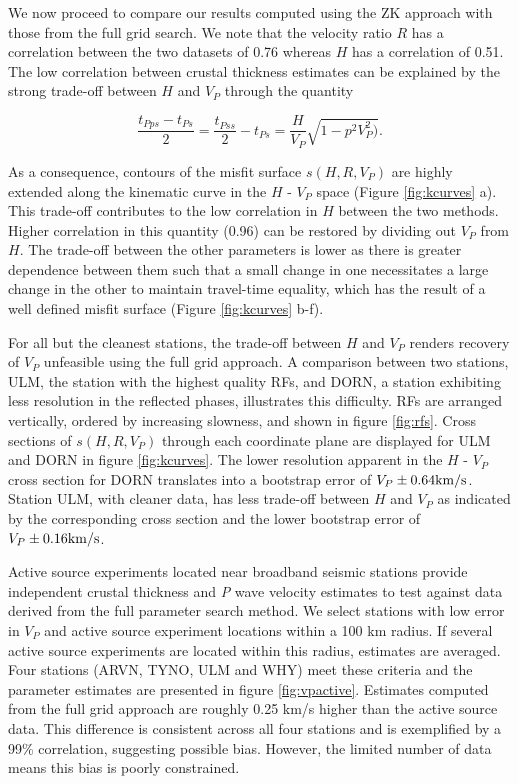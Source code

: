 \documentclass[review]{elsarticle}
\begin{document}
We now proceed to compare our results computed using the ZK approach with those from the full grid search. We note that the velocity ratio $R$ has a correlation between the two datasets of 0.76 whereas $H$ has a correlation of 0.51. The low correlation between crustal thickness estimates can be explained by the strong trade-off between $H$ and $V_P$ through the quantity

$$\frac{t_{Pps}-t_{Ps}}{2}=\frac{t_{Pss}}{2} - t_{Ps}= \frac{H}{V_P}\sqrt{1-p^2V^2_P)}.$$

\noindent As a consequence, contours of the misfit surface $s(H,R,V_P)$ are highly extended along the kinematic curve in the $H$ - $V_P$ space (Figure \ref{fig:kcurves} a). This trade-off contributes to the low correlation in $H$ between the two methods. Higher correlation in this quantity (0.96) can be restored by dividing out $V_P$ from $H$. The trade-off between the other parameters is lower as there is greater dependence between them such that a small change in one necessitates a large change in the other to maintain travel-time equality, which has the result of a well defined misfit surface (Figure \ref{fig:kcurves} b-f).

For all but the cleanest stations, the trade-off between $H$ and $V_P$ renders recovery of $V_P$ unfeasible using the full grid approach. A comparison between two stations, ULM, the station with the highest quality RFs, and DORN, a station exhibiting less resolution in the reflected phases, illustrates this difficulty. RFs are arranged vertically, ordered by increasing slowness, and shown in figure \ref{fig:rfs}. Cross sections of $s(H,R,V_P)$ through each coordinate plane are displayed for ULM and DORN in figure \ref{fig:kcurves}. The lower resolution apparent in the $H$ - $V_P$ cross section for DORN translates into a bootstrap error of $V_P \pm 0.64 {\rm km/s}$. Station ULM, with cleaner data, has less trade-off between $H$ and $V_P$ as indicated by the corresponding cross section and the lower bootstrap error of $V_P \pm 0.16 {\rm km/s}$.

Active source experiments located near broadband seismic stations provide independent crustal thickness and {\it P} wave velocity estimates to test against data derived from the full parameter search method. We select stations with low error in $V_P$ and active source experiment locations within a 100 km radius. If several active source experiments are located within this radius, estimates are averaged. Four stations (ARVN, TYNO, ULM and WHY) meet these criteria and the parameter estimates are presented in figure \ref{fig:vpactive}. Estimates computed from the full grid approach are roughly 0.25 km/s higher than the active source data. This difference is consistent across all four stations and is exemplified by a 99\% correlation, suggesting possible bias. However, the limited number of data means this bias is poorly constrained.
\end{document}
